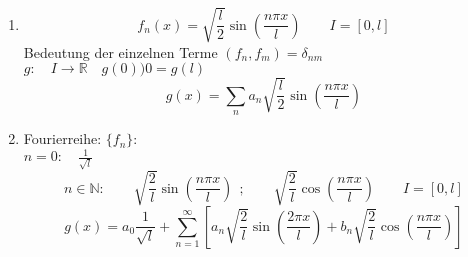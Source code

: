 \documentclass[titlepage,11pt,a4paper,ngerman]{report}
\begin{document}
\begin{enumerate}[1)]
	\item 
	\begin{equation*}
	f_n(x) = \sqrt{\frac{l}{2}} \sin\left(\frac{n \pi x}{l}\right) \qquad I = [0,l] 
	\end{equation*}Bedeutung der einzelnen Terme
	$ (f_n,f_m) = \delta_{nm} $\\
	$ g: \quad I \rightarrow \mathbb{R} \quad g(0) ) 0 = g(l) $
	\begin{equation*}
	g(x) = \sum_{n} a_n \sqrt{\frac{l}{2}} \sin \left(\frac{n \pi x}{l}\right)
	\end{equation*}
	\item Fourierreihe: $ \{f_n\} $:\\
	$ n=0: \quad \frac{1}{\sqrt{l}} $
	\begin{equation*}
	n \in \mathbb{N}: \qquad \sqrt{\frac{2}{l}} \sin \left(\frac{n \pi x}{l}\right) \ \ ; \qquad \sqrt{\frac{2}{l}} \cos\left(\frac{n \pi x}{l}\right) \qquad I = [0,l]
	\end{equation*}
	\begin{equation*}
	g(x) = a_0 \frac{1}{\sqrt{l}} + \sum_{n=1}^{\infty} \left[a_n \sqrt{\frac{2}{l}} \sin \left(\frac{2 \pi x}{l}\right) + b_n \sqrt{\frac{2}{l}} \cos\left(\frac{n \pi x}{l}\right)\right]
	\end{equation*}
	\vspace{5pt}
\end{enumerate}


\end{document}
